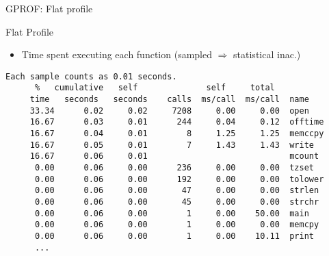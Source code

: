 \documentclass[10pt,xcolor=table]{beamer}
\begin{document}
\begin{frame}[fragile]{GPROF: Flat profile}

  \begin{block}{Flat Profile}
    \begin{itemize}
    \item Time spent executing each function {\small (sampled
        $\Rightarrow$ statistical inac.)}
    \end{itemize}
  \end{block}

  \begin{lstlisting}[gobble=3, caption={Flat profile example}]
    Each sample counts as 0.01 seconds.
      %   cumulative   self              self     total
     time   seconds   seconds    calls  ms/call  ms/call  name
     33.34      0.02     0.02     7208     0.00     0.00  open
     16.67      0.03     0.01      244     0.04     0.12  offtime
     16.67      0.04     0.01        8     1.25     1.25  memccpy
     16.67      0.05     0.01        7     1.43     1.43  write
     16.67      0.06     0.01                             mcount
      0.00      0.06     0.00      236     0.00     0.00  tzset
      0.00      0.06     0.00      192     0.00     0.00  tolower
      0.00      0.06     0.00       47     0.00     0.00  strlen
      0.00      0.06     0.00       45     0.00     0.00  strchr
      0.00      0.06     0.00        1     0.00    50.00  main
      0.00      0.06     0.00        1     0.00     0.00  memcpy
      0.00      0.06     0.00        1     0.00    10.11  print
      ...
  \end{lstlisting}

\end{frame}
\end{document}
